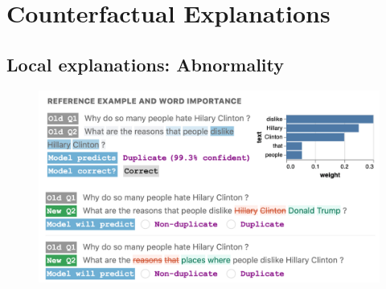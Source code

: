 
\newcommand{\fwone}[1]{\colbox{cfwone}{#1}\xspace}
\newcommand{\fwtwo}[1]{\colbox{cfwtwo}{#1}\xspace}
\newcommand{\fwthree}[1]{\colbox{cfwthree}{#1}\xspace}
\newcommand{\fwfour}[1]{\colbox{cfwfour}{#1}\xspace}

\newcommand{\fexp}[2]{\texttt{[{\color{darkgray}{#1:#2}}]}\xspace}
\newcommand{\fexptag}[1]{\fexp{TAG}{#1}}
\newcommand{\fexpfrom}[1]{\fexp{FROM}{#1}}
\newcommand{\fexpto}[1]{\fexp{TO}{#1}}
\newcommand{\fexptemp}[1]{\fexp{TEMP}{#1}}


\section{Counterfactual Explanations}


\subsection{Local explanations: Abnormality}





\begin{figure}[t]
\centering
\includegraphics[width=1\columnwidth]{figures/explanation}
\vspace{-15pt}
\caption{}
\vspace{-10pt}
\label{fig:sst_trend}
\end{figure}




